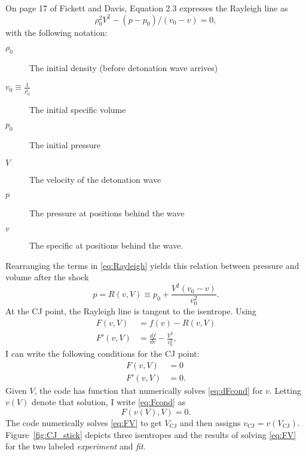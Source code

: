 \documentclass[11pt]{article}
\newcommand{\eos}{f}
\begin{document}
On page 17 of Fickett and Davis, Equation 2.3 expresses the Rayleigh
line as
\begin{equation}
  \label{eq:Rayleigh}
  \rho_0^2 V^2 - (p-p_0)/(v_0-v) = 0,
\end{equation}
with the following notation:
\begin{description}
\item[$\rho_0$] The initial density (before detonation wave arrives)
\item[$v_0\equiv\frac{1}{\rho_0}$] The initial specific volume
\item[$p_0$] The initial pressure
\item[$V$] The velocity of the detonation wave
\item[$p$] The pressure at positions behind the wave
\item[$v$] The specific at positions behind the wave.
\end{description}
Rearranging the terms in \eqref{eq:Rayleigh} yields this relation
between pressure and volume after the shock
\begin{equation*}
  p = R(v,V) \equiv p_0 + \frac{V^2(v_0-v)}{v_0^2}.
\end{equation*}
At the CJ point, the Rayleigh line is tangent to the isentrope.
Using
\begin{align*}
  F(v,V) &= \eos(v) - R(v,V) \\
  F'(v,V) &= \frac{d \eos}{d v} - \frac{V^2}{v_0^2},
\end{align*}
I can write the following conditions for the CJ point:
\begin{subequations}
  \begin{align}
    \label{eq:Fcond}
    F(v,V) &= 0 \\
    \label{eq:dFcond}
    F'(v,V) &= 0.
  \end{align}
\end{subequations}
Given $V$, the code has function that numerically solves
\eqref{eq:dFcond} for $v$.  Letting $v(V)$ denote that solution, I
write \eqref{eq:Fcond} as
\begin{equation}
  \label{eq:FV}
  F(v(V),V) = 0.
\end{equation}
The code numerically solves \eqref{eq:FV} to get $V_{\text{CJ}}$ and
then assigns $v_{\text{CJ}} = v(V_{\text{CJ}})$.
Figure~\ref{fig:CJ_stick} depicts three isentropes and the results of
solving \eqref{eq:FV} for the two labeled \emph{experiment} and
\emph{fit}.
\end{document}
